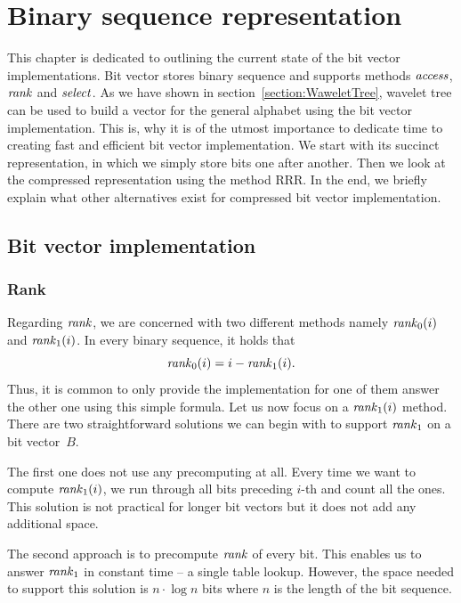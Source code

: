 \chapter{Binary sequence representation}
\label{kap:kap2}

This chapter is dedicated to outlining the current state of the bit vector
implementations. Bit vector stores binary sequence and supports methods $\mathit{access}$,
$\mathit{rank}$ and $\mathit{select}$. As we have shown in section~\ref{section:WaweletTree}, wavelet
tree can be used to build a vector for the general alphabet using the bit vector
implementation. This is, why it is of the utmost importance to dedicate time
to creating fast and efficient bit vector implementation. We start with its
succinct representation, in which we simply store bits one after another. Then we
look at the compressed representation using the method RRR. In the end, we briefly
explain what other alternatives exist for compressed bit vector implementation.

\section{Bit vector implementation}

\subsection{Rank}
\label{section:rank}

Regarding $\mathit{rank}$, we are concerned with two different methods namely $\mathit{rank}_0(i)$
and $\mathit{rank}_1(i)$. In every binary sequence, it holds that $$\mathit{rank}_0(i) = i - \mathit{rank}_1(i).$$
Thus, it is common to only provide
the implementation for one of them answer the other one using this simple formula.
Let us now focus on a $\mathit{rank}_1(i)$ method. There are two
straightforward solutions we can begin with to support $\mathit{rank}_1$ on a bit vector~$B$.

The first one does not use any precomputing at all. Every time we want
to compute $\mathit{rank}_1(i)$, we run through all bits preceding $i$-th and count all
the ones. This solution is not practical for longer bit vectors but it does not
add any additional space.

The second approach is to precompute $\mathit{rank}$ of every
bit. This enables us to answer $\mathit{rank}_1$ in constant time -- a single table lookup.
However, the space needed to support this solution is $n\cdot\log n$ bits where
$n$ is the length of the bit sequence.

